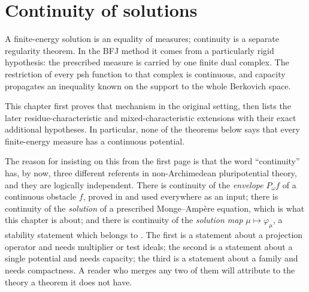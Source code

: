 \chapter{Continuity of solutions}
\label{chap:bfj-continuity}

A finite-energy solution is an equality of measures; continuity is a
separate regularity theorem.  In the BFJ method it comes from a particularly
rigid hypothesis: the prescribed measure is carried by one finite dual
complex.  The restriction of every psh function to that complex is
continuous, and capacity propagates an inequality known on the support to
the whole Berkovich space.

This chapter first proves that mechanism in the original setting, then lists
the later residue-characteristic and mixed-characteristic extensions with
their exact additional hypotheses.  In particular, none of the theorems
below says that every finite-energy measure has a continuous potential.

The reason for insisting on this from the first page is that the word
``continuity'' has, by now, three different referents in non-Archimedean
pluripotential theory, and they are logically independent.  There is
continuity of the \emph{envelope} \(P_\omega f\) of a continuous obstacle
\(f\), proved in  and used everywhere as an input;
there is continuity of the \emph{solution} of a prescribed Monge--Amp\`ere
equation, which is what this chapter is about; and there is continuity of
the \emph{solution map} \(\mu\mapsto\varphi_\mu\), a stability statement
which belongs to .  The first is a
statement about a projection operator and needs multiplier or test ideals;
the second is a statement about a single potential and needs capacity; the
third is a statement about a family and needs compactness.  A reader who
merges any two of them will attribute to the theory a theorem it does not
have.


